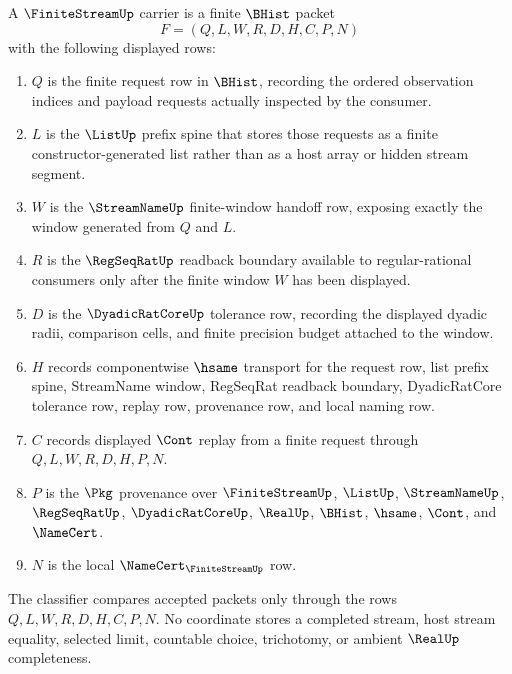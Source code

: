 \begin{definition}
\label{def:finite-stream-carrier}
A $\FiniteStreamUp$ carrier is a finite $\BHist$ packet
$$
F=(Q,L,W,R,D,H,C,P,N)
$$
with the following displayed rows:
\begin{enumerate}
\item $Q$ is the finite request row in $\BHist$, recording the ordered observation indices and payload requests actually inspected by the consumer.
\item $L$ is the $\ListUp$ prefix spine that stores those requests as a finite constructor-generated list rather than as a host array or hidden stream segment.
\item $W$ is the $\StreamNameUp$ finite-window handoff row, exposing exactly the window generated from $Q$ and $L$.
\item $R$ is the $\RegSeqRatUp$ readback boundary available to regular-rational consumers only after the finite window $W$ has been displayed.
\item $D$ is the $\DyadicRatCoreUp$ tolerance row, recording the displayed dyadic radii, comparison cells, and finite precision budget attached to the window.
\item $H$ records componentwise $\hsame$ transport for the request row, list prefix spine, StreamName window, RegSeqRat readback boundary, DyadicRatCore tolerance row, replay row, provenance row, and local naming row.
\item $C$ records displayed $\Cont$ replay from a finite request through $Q,L,W,R,D,H,P,N$.
\item $P$ is the $\Pkg$ provenance over $\FiniteStreamUp$, $\ListUp$, $\StreamNameUp$, $\RegSeqRatUp$, $\DyadicRatCoreUp$, $\RealUp$, $\BHist$, $\hsame$, $\Cont$, and $\NameCert$.
\item $N$ is the local $\NameCert_{\FiniteStreamUp}$ row.
\end{enumerate}
The classifier compares accepted packets only through the rows $Q,L,W,R,D,H,C,P,N$. No coordinate stores a completed stream, host stream equality, selected limit, countable choice, trichotomy, or ambient $\RealUp$ completeness.
\end{definition}

